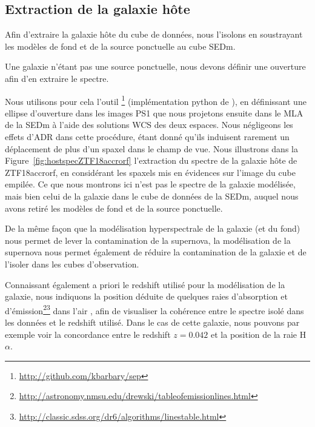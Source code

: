 \documentclass[../main/main.tex]{subfiles}
\begin{document}
\subsection{Extraction de la galaxie hôte}

Afin d'extraire la galaxie hôte du cube de données, nous l'isolons en
soustrayant les modèles de fond et de la source ponctuelle au cube SEDm.

Une galaxie n'étant pas une source ponctuelle, nous devons
définir une ouverture afin d'en extraire le spectre.

Nous utilisons pour cela l'outil \footnote{\url{http://github.com/kbarbary/sep}}
\citep{Barbary2016Sep} (implémentation python de 
\cite{Bertinsextractor}), en définissant une ellipse d'ouverture dans
les images PS1 que nous
projetons ensuite dans le MLA de la SEDm à l'aide des
solutions WCS des deux espaces. Nous négligeons
les effets d'ADR dans cette procédure, étant donné qu'ils induisent rarement un déplacement de plus d'un
spaxel dans le champ de vue. Nous illustrons dans la
Figure~\ref{fig:hostspecZTF18accrorf} l'extraction du spectre de la
galaxie hôte de ZTF18accrorf, en considérant les spaxels mis en
évidences sur l'image du cube empilée. Ce que nous montrons ici n'est
pas le spectre de la galaxie modélisée, mais bien celui de la galaxie
dans le cube de données de la SEDm, auquel nous avons retiré les modèles
de fond et de la source ponctuelle.

De la même façon que la modélisation
hyperspectrale de la galaxie (et du fond) nous permet de lever la
contamination de la supernova, la modélisation de la supernova nous
permet également de réduire la contamination de la galaxie et de
l'isoler dans les cubes d'observation.

Connaissant également a priori le redshift utilisé pour la modélisation
de la galaxie, nous indiquons la position déduite de quelques raies
d'absorption et
d'émission\footnote{\url{http://astronomy.nmsu.edu/drewski/tableofemissionlines.html}}\footnote{\url{http://classic.sdss.org/dr6/algorithms/linestable.html}}
dans l'air \citep{Morton1991}, afin de visualiser la cohérence entre le
spectre isolé dans les données et le redshift utilisé. Dans le cas de
cette galaxie, nous pouvons par exemple voir la concordance entre le redshift
$z=0.042$ et la position de la raie H$\alpha$.
\end{document}
